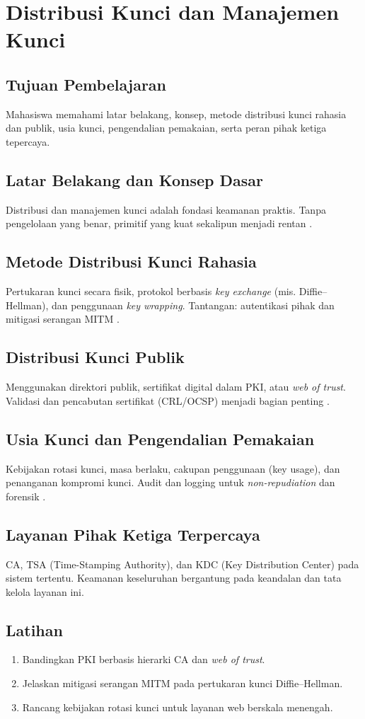 \documentclass[../main.tex]{subfiles}
\begin{document}
\chapter{Distribusi Kunci dan Manajemen Kunci}

\section{Tujuan Pembelajaran}
Mahasiswa memahami latar belakang, konsep, metode distribusi kunci rahasia dan publik, usia kunci, pengendalian pemakaian, serta peran pihak ketiga tepercaya.

\section{Latar Belakang dan Konsep Dasar}
Distribusi dan manajemen kunci adalah fondasi keamanan praktis. Tanpa pengelolaan yang benar, primitif yang kuat sekalipun menjadi rentan \citep{stallings}.

\section{Metode Distribusi Kunci Rahasia}
Pertukaran kunci secara fisik, protokol berbasis \emph{key exchange} (mis. Diffie--Hellman), dan penggunaan \emph{key wrapping}. Tantangan: autentikasi pihak dan mitigasi serangan MITM \citep{diffiehellman,katzlindell}.

\section{Distribusi Kunci Publik}
Menggunakan direktori publik, sertifikat digital dalam PKI, atau \emph{web of trust}. Validasi dan pencabutan sertifikat (CRL/OCSP) menjadi bagian penting \citep{stallings}.

\section{Usia Kunci dan Pengendalian Pemakaian}
Kebijakan rotasi kunci, masa berlaku, cakupan penggunaan (key usage), dan penanganan kompromi kunci. Audit dan logging untuk \emph{non-repudiation} dan forensik \citep{menezes}.

\section{Layanan Pihak Ketiga Terpercaya}
CA, TSA (Time-Stamping Authority), dan KDC (Key Distribution Center) pada sistem tertentu. Keamanan keseluruhan bergantung pada keandalan dan tata kelola layanan ini.

\section{Latihan}
\begin{enumerate}
  \item Bandingkan PKI berbasis hierarki CA dan \emph{web of trust}.
  \item Jelaskan mitigasi serangan MITM pada pertukaran kunci Diffie--Hellman.
  \item Rancang kebijakan rotasi kunci untuk layanan web berskala menengah.
\end{enumerate}
\end{document}
